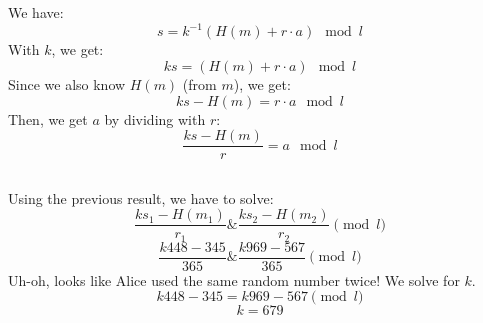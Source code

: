 \documentclass{article}
\begin{document}


\subsection{}
We have:
\[
s = k^{-1}(H(m)+r \cdot a) \mod l
\]
With $k$, we get:
\[
ks=(H(m)+r \cdot a) \mod l
\]
Since we also know $H(m)$ (from $m$), we get:
\[
ks-H(m)=r \cdot a \mod l
\]
Then, we get $a$ by dividing with $r$:
\[
\frac{ks-H(m)}{r}=a \mod l
\]

\subsection{}
Using the previous result, we have to solve:
\[
\frac{k s_1 - H(m_1)}{r_1}
\&
\frac{k s_2 - H(m_2)}{r_2}
\pmod l
\]
\[
\frac{k 448 - 345}{365}
\&
\frac{k 969 - 567}{365}
\pmod l
\]
Uh-oh, looks like Alice used the same random number twice!
We solve for $k$.
\[
k 448 - 345
=
k 969 - 567
\pmod l
\]
\[
k=679
\]
\end{document}
